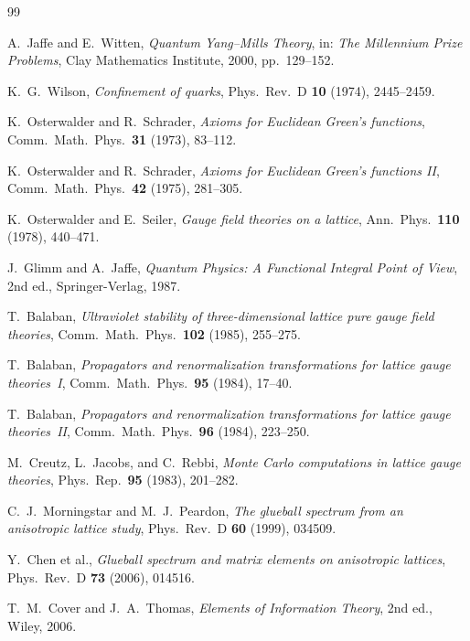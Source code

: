 \documentclass[12pt,a4paper]{article}
\theoremstyle{definition}
\theoremstyle{plain}
\theoremstyle{remark}
\begin{document}
\begin{thebibliography}{99}

A.~Jaffe and E.~Witten, \emph{Quantum Yang--Mills Theory}, in: \emph{The Millennium Prize Problems}, Clay Mathematics Institute, 2000, pp.~129--152.

K.~G.~Wilson, \emph{Confinement of quarks}, Phys.\ Rev.\ D \textbf{10} (1974), 2445--2459.

K.~Osterwalder and R.~Schrader, \emph{Axioms for Euclidean Green's functions}, Comm.\ Math.\ Phys.\ \textbf{31} (1973), 83--112.

K.~Osterwalder and R.~Schrader, \emph{Axioms for Euclidean Green's functions II}, Comm.\ Math.\ Phys.\ \textbf{42} (1975), 281--305.

K.~Osterwalder and E.~Seiler, \emph{Gauge field theories on a lattice}, Ann.\ Phys.\ \textbf{110} (1978), 440--471.

J.~Glimm and A.~Jaffe, \emph{Quantum Physics: A Functional Integral Point of View}, 2nd ed., Springer-Verlag, 1987.

T.~Balaban, \emph{Ultraviolet stability of three-dimensional lattice pure gauge field theories}, Comm.\ Math.\ Phys.\ \textbf{102} (1985), 255--275.

T.~Balaban, \emph{Propagators and renormalization transformations for lattice gauge theories~I}, Comm.\ Math.\ Phys.\ \textbf{95} (1984), 17--40.

T.~Balaban, \emph{Propagators and renormalization transformations for lattice gauge theories~II}, Comm.\ Math.\ Phys.\ \textbf{96} (1984), 223--250.

M.~Creutz, L.~Jacobs, and C.~Rebbi, \emph{Monte Carlo computations in lattice gauge theories}, Phys.\ Rep.\ \textbf{95} (1983), 201--282.

C.~J.~Morningstar and M.~J.~Peardon, \emph{The glueball spectrum from an anisotropic lattice study}, Phys.\ Rev.\ D \textbf{60} (1999), 034509.

Y.~Chen et al., \emph{Glueball spectrum and matrix elements on anisotropic lattices}, Phys.\ Rev.\ D \textbf{73} (2006), 014516.

T.~M.~Cover and J.~A.~Thomas, \emph{Elements of Information Theory}, 2nd ed., Wiley, 2006.


\end{thebibliography}
\end{document}
